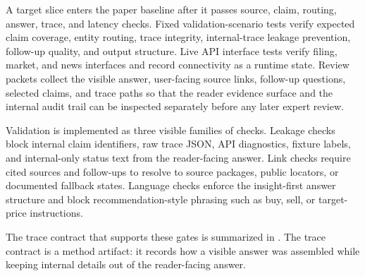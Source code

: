 A target slice enters the paper baseline after it passes source, claim, routing, answer, trace, and latency checks. Fixed validation-scenario tests verify expected claim coverage, entity routing, trace integrity, internal-trace leakage prevention, follow-up quality, and output structure. Live API interface tests verify filing, market, and news interfaces and record connectivity as a runtime state. Review packets collect the visible answer, user-facing source links, follow-up questions, selected claims, and trace paths so that the reader evidence surface and the internal audit trail can be inspected separately before any later expert review.

Validation is implemented as three visible families of checks. Leakage checks block internal claim identifiers, raw trace JSON, API diagnostics, fixture labels, and internal-only status text from the reader-facing answer. Link checks require cited sources and follow-ups to resolve to source packages, public locators, or documented fallback states. Language checks enforce the insight-first answer structure and block recommendation-style phrasing such as buy, sell, or target-price instructions.

The trace contract that supports these gates is summarized in . The trace contract is a method artifact: it records how a visible answer was assembled while keeping internal details out of the reader-facing answer.


